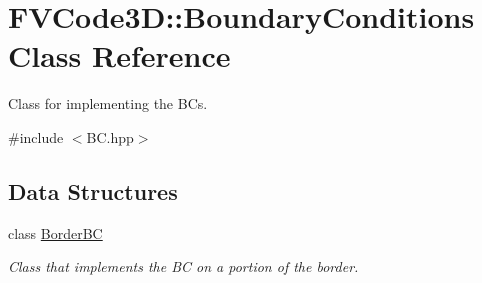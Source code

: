 \hypertarget{classFVCode3D_1_1BoundaryConditions}{}\section{F\+V\+Code3D\+:\+:Boundary\+Conditions Class Reference}
\label{classFVCode3D_1_1BoundaryConditions}


Class for implementing the B\+Cs.  




{\ttfamily \#include $<$B\+C.\+hpp$>$}

\subsection*{Data Structures}
\begin{DoxyCompactItemize}
\item 
class \hyperlink{classFVCode3D_1_1BoundaryConditions_1_1BorderBC}{Border\+BC}
\begin{DoxyCompactList}\small\item\em Class that implements the BC on a portion of the border. \end{DoxyCompactList}\end{DoxyCompactItemize}
